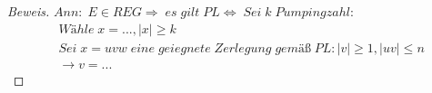\begin{proof}[Beweis]
	\begin{math}
		Ann:\;E\in REG\Rightarrow\;es\;gilt\;PL\Leftrightarrow\;Sei\;k\;Pumpingzahl:
	\end{math}
	\begin{align*}
		&Wähle\;x=...,\mid x\mid\ge k\\
		&Sei\;x=uvw\;eine\;geiegnete\;Zerlegung\;gemäß\;PL:\mid v\mid\ge1,\mid uv\mid\le n\\
		&\rightarrow v=...
	\end{align*}
\end{proof}